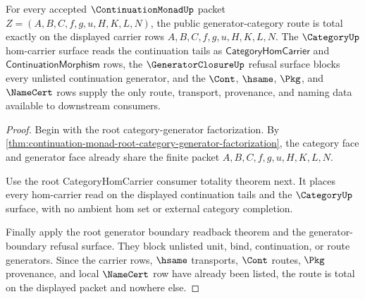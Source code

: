 \begin{theorem}
\label{thm:continuation-monad-generator-category-route-totality}
For every accepted $\ContinuationMonadUp$ packet $Z=(A,B,C,f,g,u,H,K,L,N)$, the public generator-category route is total exactly on the displayed carrier rows $A,B,C,f,g,u,H,K,L,N$. The $\CategoryUp$ hom-carrier surface reads the continuation tails as $\mathsf{CategoryHomCarrier}$ and $\mathsf{ContinuationMorphism}$ rows, the $\GeneratorClosureUp$ refusal surface blocks every unlisted continuation generator, and the $\Cont$, $\hsame$, $\Pkg$, and $\NameCert$ rows supply the only route, transport, provenance, and naming data available to downstream consumers.
\end{theorem}
\begin{proof}
Begin with the root category-generator factorization. By \autoref{thm:continuation-monad-root-category-generator-factorization}, the category face and generator face already share the finite packet $A,B,C,f,g,u,H,K,L,N$.

Use the root CategoryHomCarrier consumer totality theorem next. It places every hom-carrier read on the displayed continuation tails and the $\CategoryUp$ surface, with no ambient hom set or external category completion.

Finally apply the root generator boundary readback theorem and the generator-boundary refusal surface. They block unlisted unit, bind, continuation, or route generators. Since the carrier rows, $\hsame$ transports, $\Cont$ routes, $\Pkg$ provenance, and local $\NameCert$ row have already been listed, the route is total on the displayed packet and nowhere else.
\end{proof}


